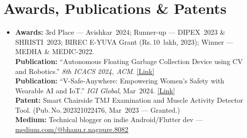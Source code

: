 \documentclass[letterpaper,10pt]{article}
\newcommand{\resumeSubHeadingListStart}{\begin{itemize}[leftmargin=0.13in, label={}]}
\newcommand{\resumeSubHeadingListEnd}{\end{itemize}}
\newcommand{\patentnum}[1]{Pub.\,No.\,#1}
\begin{document}
\section{Awards, Publications \& Patents}
\resumeSubHeadingListStart
  \item\small{
    \textbf{Awards:} 3rd Place --- Avishkar~2024; Runner-up --- DIPEX~2023 \& SHRISTI~2023; BIREC E-YUVA Grant (Rs.\,10~lakh, 2023); Winner --- MEDHA \& MEDIC-2022. \\[1pt]
    \textbf{Publication:} ``Autonomous Floating Garbage Collection Device using CV and Robotics.'' \textit{8th ICACS 2024, ACM}. \href{https://dl.acm.org/doi/10.1145/3693939.3693957}{\underline{[Link]}} \\[1pt]
    \textbf{Publication:} ``V-Safe-Anywhere: Empowering Women's Safety with Wearable AI and IoT.'' \textit{IGI Global}, Mar~2024. \href{https://www.igi-global.com/chapter/v-safe-anywhere/342150}{\underline{[Link]}} \\[1pt]
    \textbf{Patent:} Smart Chairside TMJ Examination and Muscle Activity Detector Tool. (\patentnum{202321022476}, Mar~2023 --- Granted.) \\[1pt]
    \textbf{Medium:} Technical blogger on indie Android/Flutter dev --- \href{https://medium.com/@bhanu.r.nagpure.8082}{\underline{medium.com/@bhanu.r.nagpure.8082}}
  }
\resumeSubHeadingListEnd
\end{document}
